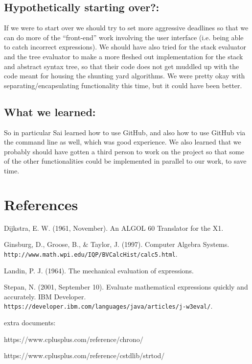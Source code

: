 \documentclass[11pt]{article}
\begin{document}
\subsection*{Hypothetically starting over?:}
If we were to start over we should try to set more aggressive deadlines so that we can do more of the ``front-end'' work involving the user interface (i.e. being able to catch incorrect expressions). We should have also tried for the stack evaluator and the tree evaluator to make a more fleshed out implementation for the stack and abstract syntax tree, so that their code does not get muddled up with the code meant for housing the shunting yard algorithms. We were pretty okay with separating/encapsulating functionality this time, but it could have been better.

\subsection*{What we learned:}
So in particular Sai learned how to use GitHub, and also how to use GitHub via the command line as well, which was good experience. We also learned that we probably should have gotten a third person to work on the project so that some of the other functionalities could be implemented in parallel to our work, to save time.

\noindent\makebox[\linewidth]{\rule{19.1cm}{0.4pt}}

\section*{References}
Dijkstra, E. W. (1961, November). An ALGOL 60 Translator for the X1.

Ginsburg, D., Groose, B., \& Taylor, J. (1997). Computer Algebra Systems.\\ \texttt{http://www.math.wpi.edu/IQP/BVCalcHist/calc5.html}.

Landin, P. J. (1964). The mechanical evaluation of expressions.

Stepan, N. (2001, September 10). Evaluate mathematical expressions quickly and accurately. IBM Developer.\\ \texttt{https://developer.ibm.com/languages/java/articles/j-w3eval/}.

extra documents:

https://www.cplusplus.com/reference/chrono/

https://www.cplusplus.com/reference/cstdlib/strtod/
\end{document}
